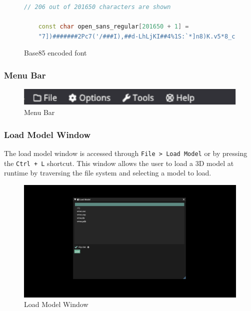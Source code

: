 \documentclass[11pt]{article}
\begin{document}
\begin{figure}[H]
  \centering
  \begin{lstlisting}[language=C++]
    // 206 out of 201650 characters are shown

    const char open_sans_regular[201650 + 1] =
    "7])#######2Pc7('/###I),##d-LhLjKI##4%1S:`*]n8)K.v5*8_c)iZ;99=$$$$c(m]4pKdp/(RdL<snZo'oI,hLNDnx4Uu/>8Q7oo^eFb3hB4JYc'Tx-3l_wgd2Tf._r+&sAqV,-G"":F8LD=5,n]A&aA+<gXG-<iobW&>$>QJ8Z.W$jg0Fv-o^(^JJnf4T"
  \end{lstlisting}
  \caption{Base85 encoded font}
  \label{fig:base85_font}
\end{figure}

\subsubsection{Menu Bar}

\begin{figure}[H]
  \centering
  \includegraphics[width=\textwidth]{images/menu_bar.png}
  \caption{Menu Bar}
  \label{fig:menu_bar}
\end{figure}


\subsubsection{Load Model Window} \label{load_model}
The load model window is accessed through \lstinline{File > Load Model} or by
pressing the \lstinline{Ctrl + L} shortcut. This window allows the user to load
a 3D model at runtime by traversing the file system and selecting a model to
load.

\begin{figure}[H]
  \centering
  \includegraphics[width=\textwidth]{images/load_model_window.png}
  \caption{Load Model Window}
  \label{fig:load_model_window}
\end{figure}
\end{document}
